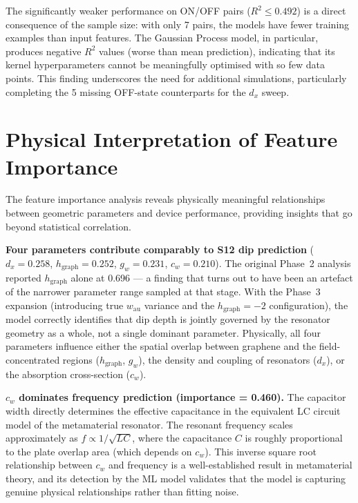 \documentclass[12pt,a4paper]{report}
\begin{document}
The significantly weaker performance on ON/OFF pairs ($R^2 \leq 0.492$) is a direct consequence of the sample size: with only 7 pairs, the models have fewer training examples than input features. The Gaussian Process model, in particular, produces negative $R^2$ values (worse than mean prediction), indicating that its kernel hyperparameters cannot be meaningfully optimised with so few data points. This finding underscores the need for additional simulations, particularly completing the 5 missing OFF-state counterparts for the $d_x$ sweep.

\section{Physical Interpretation of Feature Importance}
\label{sec:physical_interpretation}

The feature importance analysis reveals physically meaningful relationships between geometric parameters and device performance, providing insights that go beyond statistical correlation.

\textbf{Four parameters contribute comparably to S12 dip prediction} ($d_x = 0.258$, $h_{\text{graph}} = 0.252$, $g_w = 0.231$, $c_w = 0.210$). The original Phase~2 analysis reported $h_{\text{graph}}$ alone at 0.696 --- a finding that turns out to have been an artefact of the narrower parameter range sampled at that stage. With the Phase~3 expansion (introducing true $w_{\text{au}}$ variance and the $h_{\text{graph}} = -2$ configuration), the model correctly identifies that dip depth is jointly governed by the resonator geometry as a whole, not a single dominant parameter. Physically, all four parameters influence either the spatial overlap between graphene and the field-concentrated regions ($h_{\text{graph}}$, $g_w$), the density and coupling of resonators ($d_x$), or the absorption cross-section ($c_w$).

\textbf{$c_w$ dominates frequency prediction (importance = 0.460).} The capacitor width directly determines the effective capacitance in the equivalent LC circuit model of the metamaterial resonator. The resonant frequency scales approximately as $f \propto 1/\sqrt{LC}$, where the capacitance $C$ is roughly proportional to the plate overlap area (which depends on $c_w$). This inverse square root relationship between $c_w$ and frequency is a well-established result in metamaterial theory, and its detection by the ML model validates that the model is capturing genuine physical relationships rather than fitting noise.
\end{document}
